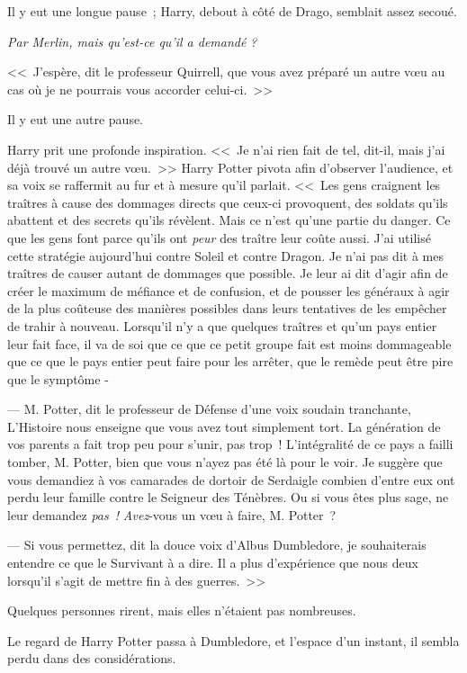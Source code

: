 Il y eut une longue pause~; Harry, debout à côté de Drago, semblait assez secoué.

\emph{Par Merlin, mais qu'est-ce qu'il a demandé} \emph{?}

<<~J'espère, dit le professeur Quirrell, que vous avez préparé un autre vœu au cas où je ne pourrais vous accorder celui-ci.~>>

Il y eut une autre pause.

Harry prit une profonde inspiration. <<~Je n'ai rien fait de tel, dit-il, mais j'ai déjà trouvé un autre vœu.~>> Harry Potter pivota afin d'observer l'audience, et sa voix se raffermit au fur et à mesure qu'il parlait. <<~Les gens craignent les traîtres à cause des dommages directs que ceux-ci provoquent, des soldats qu'ils abattent et des secrets qu'ils révèlent. Mais ce n'est qu'une partie du danger. Ce que les gens font parce qu'ils ont \emph{peur} des traître leur coûte aussi. J'ai utilisé cette stratégie aujourd'hui contre Soleil et contre Dragon. Je n'ai pas dit à mes traîtres de causer autant de dommages que possible. Je leur ai dit d'agir afin de créer le maximum de méfiance et de confusion, et de pousser les généraux à agir de la plus coûteuse des manières possibles dans leurs tentatives de les empêcher de trahir à nouveau. Lorsqu'il n'y a que quelques traîtres et qu'un pays entier leur fait face, il va de soi que ce que ce petit groupe fait est moins dommageable que ce que le pays entier peut faire pour les arrêter, que le remède peut être pire que le symptôme -

--- M. Potter, dit le professeur de Défense d'une voix soudain tranchante, L'Histoire nous enseigne que vous avez tout simplement tort. La génération de vos parents a fait trop peu pour s'unir, pas trop~! L'intégralité de ce pays a failli tomber, M. Potter, bien que vous n'ayez pas été là pour le voir. Je suggère que vous demandiez à vos camarades de dortoir de Serdaigle combien d'entre eux ont perdu leur famille contre le Seigneur des Ténèbres. Ou si vous êtes plus sage, ne leur demandez \emph{pas~!} \emph{Avez}-vous un vœu à faire, M. Potter~?

--- Si vous permettez, dit la douce voix d'Albus Dumbledore, je souhaiterais entendre ce que le Survivant à a dire. Il a plus d'expérience que nous deux lorsqu'il s'agit de mettre fin à des guerres.~>>

Quelques personnes rirent, mais elles n'étaient pas nombreuses.

Le regard de Harry Potter passa à Dumbledore, et l'espace d'un instant, il sembla perdu dans des considérations.

